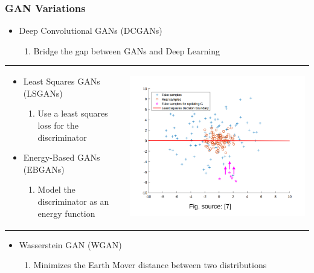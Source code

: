 \documentclass{beamer}
\begin{document}
\begin{frame}
\frametitle{\textbf{GAN Variations}}
\begin{itemize}
\addtolength{\itemindent}{2.5mm}
\item Deep Convolutional GANs (DCGANs)
	   \begin{enumerate}[$-$]
         \item Bridge the gap between GANs and Deep Learning
      \end{enumerate}
\end{itemize}

\begin{tabular}{ll}
\begin{minipage}{0.57\textwidth}
   \begin{itemize}      
      \item Least Squares GANs (LSGANs)
	   \begin{enumerate}[$-$]
         \item Use a least squares loss for the discriminator
      \end{enumerate}
      \vspace{1.5mm}
      \item Energy-Based GANs (EBGANs)
	   \begin{enumerate}[$-$]
         \item Model the discriminator as an energy function
      \end{enumerate}
   \end{itemize}
\end{minipage}
&
\begin{minipage}{0.43\textwidth}
\includegraphics[width=\linewidth]{10.pdf}\end{minipage}
\end{tabular}

\begin{itemize}
\addtolength{\itemindent}{2.5mm}
  \item Wasserstein GAN (WGAN)
	   \begin{enumerate}[$-$]
         \item Minimizes the Earth Mover distance between two distributions
      \end{enumerate}
\end{itemize}


\end{frame}
\end{document}
